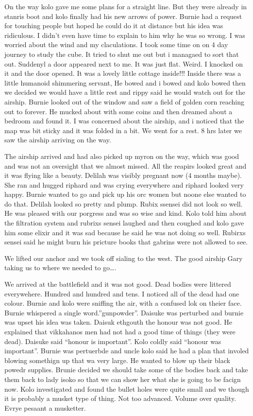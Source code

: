On the way kolo gave me some plans for a straight line. But they were already in stanris boot and kolo finally had his new arrows of power. Burnie had a request for touching people but hoped he could do it at distance but his idea was ridiculous. I didn’t even have time to explain to him why he was so wrong. I was worried about the wind and my claculations. I took some time on on 4 day journey to study the cube. It tried to shut me out but i managaed to sort that out. Suddenyl a door appeared next to me. It was just flat. Weird. I knocked on it and the door opened. It was a lovely little cottage inside!!! Inside there was a little humanoid shimmering servant, He bowed and i bowed and kolo bowed then we decided we would have a little rest and rippy said he would watch out for the airship. Burnie looked out of the window and saw a field of golden corn reaching out to forever. He mucked about with some coins and then dreamed about a bedroom and found it. I was concerned about the airship, and i noticed that the map was bit sticky and it was folded in a bit. We went for a rest. 8 hrs later we saw the airship arriving on the way.\medskip

The airship arrived and had also picked up myron on the way, which was good and was not an oversight that we almost missed. All the reapirs looked great and it was flying like a beauty. Delilah was visibly pregnant now (4 months maybe). She ran and hugged riphard and was crying everywhere and riphard looked very happy. Burnie wanted to go and pick up his orc women but noone else wanted to do that. Delilah looked so pretty and plump. Rubix ssensei did not look so well. He was pleased with our porgress and was so wise and kind. Kolo told him about the filtration system and rubrixs sensei laughed and then coughed and kolo gave him some elixir and it was sad because he said he was not doing so well. Rubirxs sensei said he might burn his pricture books that gabrins were not allowed to see.\medskip

We lifted our anchor and we took off sialing to the west. The good airship Gary taking us to where we needed to go….\medskip

We arrived at the battlefield and it was not good. Dead bodies were littered everywehere. Hundred and hundred and tens. I noticed all of the dead had one colour. Burnie and kolo were sniffing the air, with a confused lok on theier face. Burnie whispered a single word.”gunpowder”. Daisuke was perturbed and burnie was upset his idea was taken. Daisuk ethgouth the honour was not good. He explained that vikkahanos men had not had a good time of things (they were dead). Daisuke said “honour is important”. Kolo coldly said “honour was important”. Burnie was pertuerbde and uncle kolo said he had a plan that involed blowing somethign up that wa very large. He wanted to blow up their black powedr supplies. Brunie decided we should take some of the bodies back and take them back to lady isoko so that we can show her what she is going to be facign now. Kolo investigated and found the bullet holes were quite small and we though it is probably a musket type of thing. Not too advanced. Volume over quality. Evrye pesaant a musketter.\medskip

